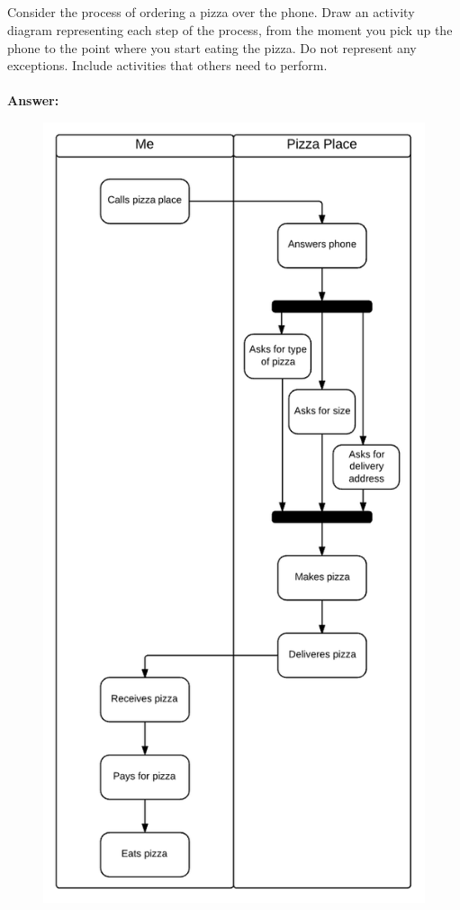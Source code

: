 \documentclass[a4paper]{article}
\begin{document}
\subsection{}
Consider the process of ordering a pizza over the phone. Draw an activity diagram representing each step of the process, from the moment you pick up the phone to the point where you start eating the pizza. Do not represent any exceptions. Include activities that others need to perform.\\
\\
\textbf{Answer:} 
\begin{figure}[H]
\includegraphics[]{ActivityWOE}
\centering
\end{figure}
\end{document}
